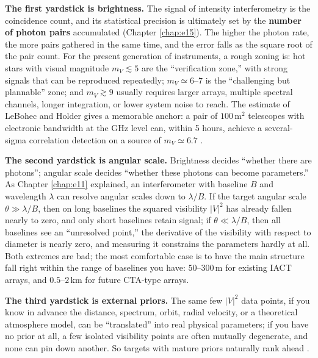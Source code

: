\textbf{The first yardstick is brightness.} The signal of intensity interferometry is the coincidence count, and its statistical precision is ultimately set by the \textbf{number of photon pairs} accumulated (Chapter \ref{chap:e15}). The higher the photon rate, the more pairs gathered in the same time, and the error falls as the square root of the pair count. For the present generation of instruments, a rough zoning is: hot stars with visual magnitude \(m_V\lesssim5\) are the ``verification zone,'' with strong signals that can be reproduced repeatedly; \(m_V\simeq6\text{--}7\) is the ``challenging but plannable'' zone; and \(m_V\gtrsim9\) usually requires larger arrays, multiple spectral channels, longer integration, or lower system noise to reach. The estimate of LeBohec and Holder gives a memorable anchor: a pair of \(100\,\mathrm{m^2}\) telescopes with electronic bandwidth at the GHz level can, within 5 hours, achieve a several-sigma correlation detection on a source of \(m_V\simeq6.7\) \citep{2006ApJ...649..399L,2013APh....43..331D}.

\textbf{The second yardstick is angular scale.} Brightness decides ``whether there are photons''; angular scale decides ``whether these photons can become parameters.'' As Chapter \ref{chap:e11} explained, an interferometer with baseline \(B\) and wavelength \(\lambda\) can resolve angular scales down to \(\lambda/B\). If the target angular scale \(\theta\gg\lambda/B\), then on long baselines the squared visibility \(|V|^2\) has already fallen nearly to zero, and only short baselines retain signal; if \(\theta\ll\lambda/B\), then all baselines see an ``unresolved point,'' the derivative of the visibility with respect to diameter is nearly zero, and measuring it constrains the parameters hardly at all. Both extremes are bad; the most comfortable case is to have the main structure fall right within the range of baselines you have: \(50\text{--}300\,\mathrm{m}\) for existing IACT arrays, and \(0.5\text{--}2\,\mathrm{km}\) for future CTA-type arrays.

\textbf{The third yardstick is external priors.} The same few \(|V|^2\) data points, if you know in advance the distance, spectrum, orbit, radial velocity, or a theoretical atmosphere model, can be ``translated'' into real physical parameters; if you have no prior at all, a few isolated visibility points are often mutually degenerate, and none can pin down another. So targets with mature priors naturally rank ahead \citep{2003RPPh...66..789M,2012MNRAS.419..172N}.

